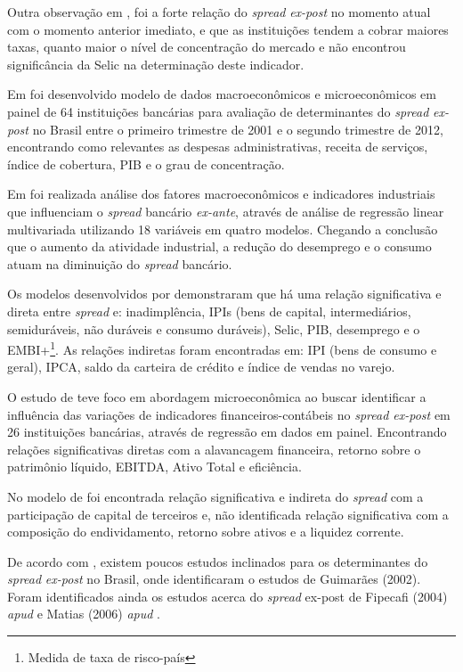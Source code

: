 \documentclass[
  12pt,
  12pt,
  openright,
  oneside,
  a4paper,
  chapter=TITLE,
  section=TITLE,
  subsection=TITLE,
  subsubsection=TITLE,
  portugues,
  sumario=tradicional]{abntex2}
\begin{document}
Outra observação em \textcite{dantas:2012}, foi a forte relação do \emph{spread} \emph{ex-post} no momento atual com o momento anterior imediato, e que as instituições tendem a cobrar maiores taxas, quanto maior o nível de concentração do mercado e não encontrou significância da Selic na determinação deste indicador.

Em \textcite{almeida:2013} foi desenvolvido modelo de dados macroeconômicos e microeconômicos em painel de 64 instituições bancárias para avaliação de determinantes do \emph{spread} \emph{ex-post} no Brasil entre o primeiro trimestre de 2001 e o segundo trimestre de 2012, encontrando como relevantes as despesas administrativas, receita de serviços, índice de cobertura, PIB e o grau de concentração.

Em \textcite{durigan:2018} foi realizada análise dos fatores macroeconômicos e indicadores industriais que influenciam o \emph{spread} bancário \emph{ex-ante}, através de análise de regressão linear multivariada utilizando 18 variáveis em quatro modelos. Chegando a conclusão que o aumento da atividade industrial, a redução
do desemprego e o consumo atuam na diminuição do \emph{spread} bancário.

Os modelos desenvolvidos por \textcite{durigan:2018} demonstraram que há uma relação significativa e direta entre \emph{spread} e: inadimplência, IPIs (bens de capital, intermediários, semiduráveis, não duráveis e consumo duráveis), Selic, PIB, desemprego e o EMBI+\footnote{Medida de taxa de risco-país}. As relações indiretas foram encontradas em: IPI (bens de consumo e geral), IPCA, saldo da carteira de crédito e índice de vendas no varejo.

O estudo de \textcite{timotio:2018} teve foco em abordagem microeconômica ao buscar identificar a influência das variações de indicadores financeiros-contábeis no \emph{spread ex-post} em 26 instituições bancárias, através de regressão em dados em painel. Encontrando relações significativas diretas com a alavancagem financeira, retorno sobre o patrimônio líquido, EBITDA, Ativo Total e eficiência.

No modelo de \textcite{timotio:2018} foi encontrada relação significativa e indireta do \emph{spread} com a participação de capital de terceiros e, não identificada relação significativa com a composição do endividamento, retorno sobre ativos e a liquidez corrente.

De acordo com \textcite{durigan:2018, dantas:2012}, existem poucos estudos inclinados para os determinantes do \emph{spread} \emph{ex-post} no Brasil, onde identificaram o estudos de Guimarães (2002). Foram identificados ainda os estudos acerca do \emph{spread} ex-post de Fipecafi (2004) \emph{apud} \textcite{dantas:2012} e Matias (2006) \emph{apud} \textcite{leal:2006}.
\end{document}
